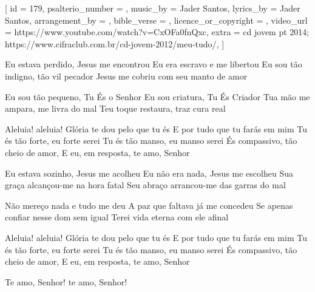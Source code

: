 [
    id                     = {179},
    psalterio_number       = {},
    music_by               = {Jader Santos},
    lyrics_by              = {Jader Santos},
    arrangement_by         = {},
    bible_verse            = {},
    licence_or_copyright   = {},
    video_url              = {https://www.youtube.com/watch?v=CxOFa0fnQxc},
    extra                  = {cd jovem pt 2014; https://www.cifraclub.com.br/cd-jovem-2012/meu-tudo/},
]

\beginverse
Eu estava perdido, Jesus me encontrou
Eu era escravo e me libertou
Eu sou tão indigno, tão vil pecador
Jesus me cobriu com seu manto de amor
\endverse

\beginverse
Eu sou tão pequeno, Tu És o Senhor
Eu sou criatura, Tu És Criador
Tua mão me ampara, me livra do mal
Teu toque restaura, traz cura real
\endverse

\beginchorus
Aleluia! aleluia!
Glória te dou pelo que tu és
E por tudo que tu farás em mim
Tu és tão forte, eu forte serei
Tu és tão manso, eu manso serei
És compassivo, tão cheio de amor,
E eu, em resposta, te amo, Senhor
\endchorus

\beginverse
Eu estava sozinho, Jesus me acolheu
Eu não era nada, Jesus me escolheu
Sua graça alcançou-me na hora fatal
Seu abraço arrancou-me das garras do mal
\endverse

\beginverse
Não mereço nada e tudo me deu
A paz que faltava já me concedeu
Se apenas confiar nesse dom sem igual
Terei vida eterna com ele afinal
\endverse

\beginchorus
Aleluia! aleluia!
Glória te dou pelo que tu és
E por tudo que tu farás em mim
Tu és tão forte, eu forte serei
Tu és tão manso, eu manso serei
És compassivo, tão cheio de amor,
E eu, em resposta, te amo, Senhor

Te amo, Senhor! te amo, Senhor!
\endchorus



\endsong
